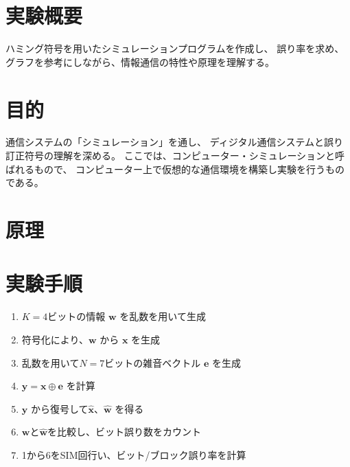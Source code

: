 \documentclass[12pt]{jarticle}
\begin{document}



\section{実験概要}
ハミング符号を用いたシミュレーションプログラムを作成し、
誤り率を求め、グラフを参考にしながら、情報通信の特性や原理を理解する。

\section{目的}
通信システムの「シミュレーション」を通し、
ディジタル通信システムと誤り訂正符号の理解を深める。
ここでは、コンピューター・シミュレーションと呼ばれるもので、
コンピューター上で仮想的な通信環境を構築し実験を行うものである。

\section{原理}

\section{実験手順}
\begin{enumerate}
    \item $K=4$ビットの情報 $\boldsymbol{w}$ を乱数を用いて生成
    \item 符号化により、$\boldsymbol{w}$ から $\boldsymbol{x}$ を生成
    \item 乱数を用いて$N=7$ビットの雑音ベクトル $\boldsymbol{e}$ を生成
    \item $\boldsymbol{y}=\boldsymbol{x}\oplus \boldsymbol{e}$ を計算
    \item $\boldsymbol{y}$ から復号して$\hat{\boldsymbol{x}}$、$\hat{\boldsymbol{w}}$ を得る
    \item $\boldsymbol{w}$と$\hat{\boldsymbol{w}}$を比較し、ビット誤り数をカウント
    \item 1から6をSIM回行い、ビット/ブロック誤り率を計算
\end{enumerate}
\end{document}
